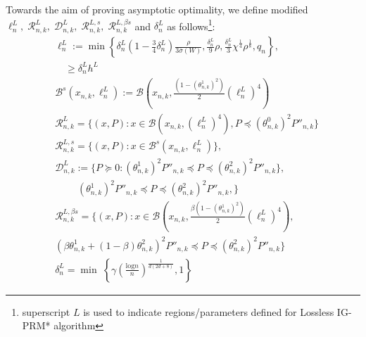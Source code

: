 \documentclass[Afour,sageh,times]{sagej}
\begin{document}
Towards the aim of proving asymptotic optimality, we define modified $\ell^L_n,\;\mathcal{R}^L_{n,k},\;\mathcal{D}^L_{n,k},\;\mathcal{R}^{L,s}_{n,k},\;\mathcal{R}^{L,\beta s}_{n,k}$ and $\delta^L_n$ as follows\footnote{superscript $L$ is used to indicate regions/parameters defined for Lossless IG-PRM* algorithm}:
\begin{align}
     & \ell^L_n:=\min\left\{  \delta^L_n\left(1-\frac{3}{4}\delta^L_n\right)\frac{\rho}{3\bar{\sigma}(W)},{\frac{\delta^L_n}{9}\rho},{\frac{\delta^L_n}{3}\chi^{\frac{1}{4}}{\rho}^{\frac{1}{8}}},q_n\right\},\nonumber\\
     &\quad\geq \delta^L_n h^L \nonumber\\
             & \mathcal{B}^s(x_{n,k},\ell^L_n):=\mathcal{B}(x_{n,k},\frac{(1-(\theta^1_{n,k})^2)}{2}(\ell^L_n)^4)\nonumber\\
        &\mathcal{R}^L_{n,k}=\{(x,P): x\in \mathcal{B}(x_{n,k},(\ell^L_n)^4), P\preceq {\left(\theta^0_{n,k}\right)^2}P''_{n,k} \}\nonumber\\
           &\mathcal{R}^{L,s}_{n,k}=\{(x,P):x\in \mathcal{B}^s(x_{n,k},\ell^L_n)\},\nonumber\\
       &\mathcal{D}^L_{n, k}:=\{P\succeq0: {(\theta^1_{n,k})^2} P''_{n,k} \preceq P\preceq {(\theta^2_{n,k})^2} P''_{n,k}\},\nonumber\\
&\;\quad\quad{(\theta^1_{n,k})^2}P''_{n,k}\preceq P\preceq {(\theta^2_{n,k})^2} P''_{n,k},\} \nonumber\\
            &\mathcal{R}^{L,\beta s}_{n,k}=\Biggl\{(x,P): x\in\mathcal{B}\left(x_{n,k},\frac{\beta(1-(\theta^1_{n,k})^2)}{2}(\ell^L_n)^4\right),\nonumber\\ 
    &{(\beta\theta^1_{n,k}+(1-\beta)\theta^2_{n,k})^2}P''_{n,k}\preceq P \preceq {(\theta^2_{n,k})^2}P''_{n,k}\Biggl\}\nonumber\\
        &\delta^L_n=\min\;\left\{\gamma\left(\frac{\text{log}n}{n}\right)^\frac{1}{d(2d+8)},1\right\}\nonumber
\end{align}
\end{document}
